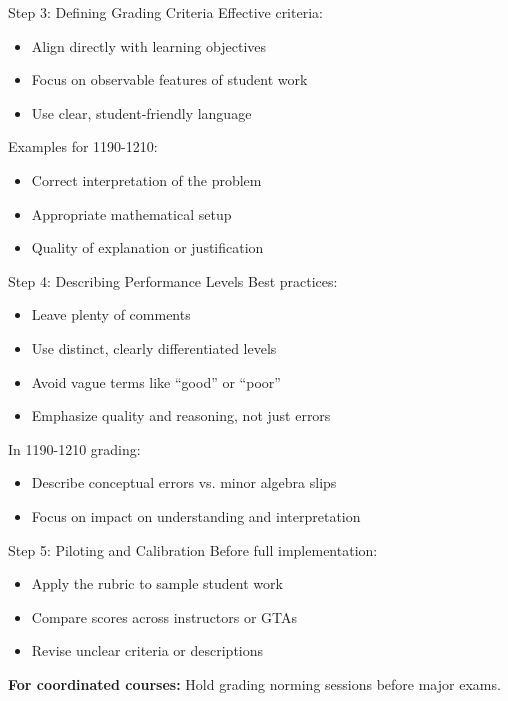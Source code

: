 \documentclass{beamer}
\begin{document}
\begin{frame}{Step 3: Defining Grading Criteria}
Effective criteria:
\begin{itemize}
    \item Align directly with learning objectives
    \item Focus on observable features of student work
    \item Use clear, student-friendly language
\end{itemize}

\vspace{0.3cm}
Examples for 1190-1210:
\begin{itemize}
    \item Correct interpretation of the problem
    \item Appropriate mathematical setup
    \item Quality of explanation or justification
\end{itemize}
\end{frame}

\begin{frame}{Step 4: Describing Performance Levels}
Best practices:
\begin{itemize}
    \item Leave plenty of comments
    \item Use distinct, clearly differentiated levels
    \item Avoid vague terms like ``good'' or ``poor''
    \item Emphasize quality and reasoning, not just errors
\end{itemize}

\vspace{0.3cm}
In 1190-1210 grading:
\begin{itemize}
    \item Describe conceptual errors vs. minor algebra slips
    \item Focus on impact on understanding and interpretation
\end{itemize}
\end{frame}

\begin{frame}{Step 5: Piloting and Calibration}
Before full implementation:
\begin{itemize}
    \item Apply the rubric to sample student work
    \item Compare scores across instructors or GTAs
    \item Revise unclear criteria or descriptions
\end{itemize}

\vspace{0.3cm}
\textbf{For coordinated courses:}
Hold grading norming sessions before major exams. 
\end{frame}
\end{document}
